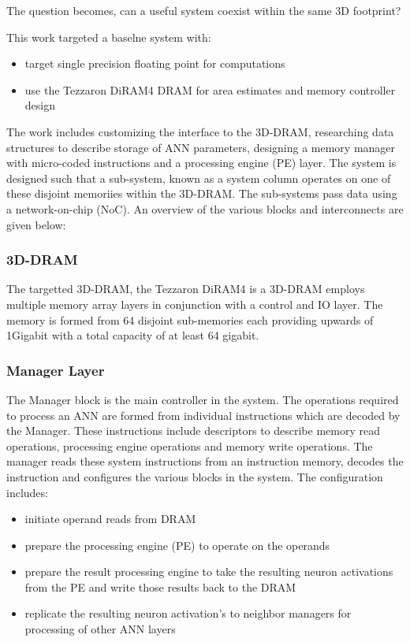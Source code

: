 \documentclass[journal]{IEEEtran}
\begin{document}
The question becomes, can a useful system coexist within the same 3D footprint?

This work targeted a baselne system with:
\begin{itemize}
  \itemsep0em 
  \item target single precision floating point for computations
  \item use the Tezzaron DiRAM4 DRAM for area estimates and memory controller design
\end{itemize}
The work includes customizing the interface to the 3D-DRAM, researching data structures to describe storage of ANN parameters, designing a memory manager with micro-coded instructions and a processing engine (PE) layer.
The system is designed such that a sub-system, known as a system column operates on one of these disjoint memoriies within the 3D-DRAM. The sub-systems pass data using a network-on-chip (NoC).
An overview of the various blocks and interconnects are given below:

\subsubsection{3D-DRAM}
The targetted 3D-DRAM, the Tezzaron DiRAM4 is a 3D-DRAM employs multiple memory array layers in conjunction with a control and IO layer.
The memory is formed from 64 disjoint sub-memories each providing upwards of 1Gigabit with a total capacity of at least 64 gigabit.

\subsubsection{Manager Layer}
The Manager block is the main controller in the system. The operations required to process an ANN are formed from individual instructions which are decoded by the Manager. 
These instructions include descriptors to describe memory read operations, processing engine operations and memory write operations. The manager reads these system instructions from an instruction memory, decodes the instruction and configures the various blocks in the system.
The configuration includes:
\begin{itemize}

      \item initiate operand reads from DRAM
      \item prepare the processing engine (PE) to operate on the operands
      \item prepare the result processing engine to take the resulting neuron activations from the PE and write those results back to the DRAM
      \item replicate the resulting neuron activation's to neighbor managers for processing of other ANN layers

\end{itemize}
\end{document}
